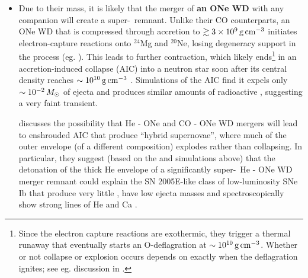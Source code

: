 \begin{itemize}


	\item Due to their mass, it is likely that the merger of {\bf an ONe WD} with any companion will create a super-\Mch\ remnant.  Unlike their CO counterparts, an ONe WD that is compressed through accretion to $\gtrsim3\times10^9\,\gcc$ initiates electron-capture reactions onto $^{24}$Mg and $^{20}$Ne, losing degeneracy support in the process (eg. \citealt{miya+80, saion85, schwqb15}).  This leads to further contraction, which likely ends\footnote{Since the electron capture reactions are exothermic, they trigger a thermal runaway that eventually starts an O-deflagration at $\sim10^{10}\,\gcc$.  Whether or not collapse or explosion occurs depends on exactly when the deflagration ignites; see eg. discussion in \cite{schwqb15}.} in an accretion-induced collapse (AIC) into a neutron star soon after its central density reaches $\sim10^{10}\,\gcc$ \citep{schwqb15}.  Simulations \citep{dess+06, dess+07, frye+09} of the AIC find it expels only $\sim10^{-2}\,\Msun$ of ejecta and produces similar amounts of radioactive \Ni, suggesting a very faint transient.


\cite{dan+14} discusses the possibility that He - ONe and CO - ONe WD mergers will lead to enshrouded AIC that produce ``hybrid supernovae'', where much of the outer envelope (of a different composition) explodes rather than collapsing.  In particular, they suggest (based on the \cite{shen+10he} and \cite{wald+11} simulations above) that the detonation of the thick He envelope of a significantly super-\Mch\ He - ONe WD merger remnant could  explain the SN 2005E-like class of low-luminosity SNe Ib that produce very little \Ni, have low ejecta masses and spectroscopically show strong lines of He and Ca \citep{pere+10}.


\end{itemize}
